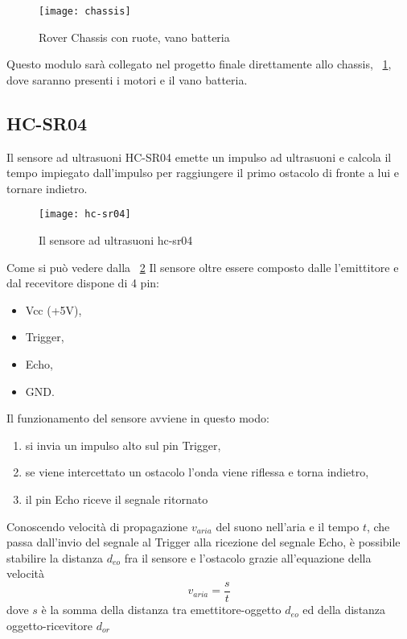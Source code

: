 \begin{figure}[htbp!] 
	\centering    
	\texttt{[image: chassis]}
	\caption[Rover Chassis]{Rover Chassis con ruote, vano batteria}
	\label{fig:chassis}
\end{figure}
Questo modulo sarà collegato nel progetto finale direttamente allo chassis, \figurename~\ref{fig:chassis}, dove saranno presenti i motori e il vano batteria.


\subsection{HC-SR04}


Il  sensore ad ultrasuoni HC-SR04 emette un impulso ad ultrasuoni e calcola il tempo impiegato dall’impulso per raggiungere il primo ostacolo di fronte a lui e tornare indietro.


\begin{figure}[htbp!] 
	\centering    
	\texttt{[image: hc-sr04]}
	\caption[HC-SR04]{Il sensore ad ultrasuoni hc-sr04}
	\label{fig:hc-sr04}
\end{figure}
Come si può vedere dalla \figurename~\ref{fig:hc-sr04} Il sensore oltre essere composto dalle l'emittitore e dal recevitore dispone di 4 pin:
\begin{itemize}
 \item Vcc (+5V), 
 \item Trigger, 
 \item Echo, 
 \item GND. 
\end{itemize}

Il funzionamento del sensore avviene in questo modo:
\begin{enumerate}
 \item si invia un impulso alto sul pin Trigger,
 \item se viene intercettato un ostacolo l’onda viene riflessa e torna indietro,
 \item il pin Echo riceve il segnale ritornato
\end{enumerate}

Conoscendo velocità di propagazione $ v_{aria} $ del suono nell’aria e  il tempo $t$, che passa dall'invio del segnale al Trigger alla ricezione del segnale Echo, è possibile stabilire la distanza $d_{eo}$ fra il sensore e l’ostacolo  grazie all'equazione della velocità  \[v_{aria} = \dfrac{s}{t} \] dove $s$ è la somma della distanza tra emettitore-oggetto $d_{eo}$ ed della distanza oggetto-ricevitore $d_{or}$ 

